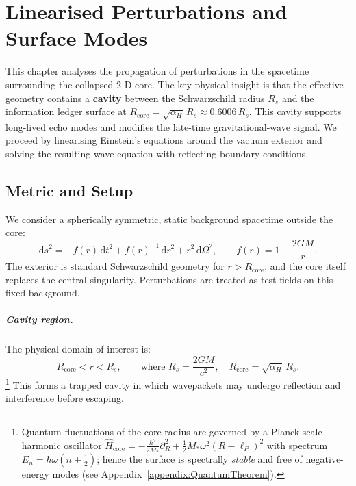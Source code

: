 \documentclass[a4paper, 12pt, oneside]{book}
\numberwithin{equation}{chapter}
\begin{document}

\chapter[Linearised Perturbations and Surface Modes]{Linearised Perturbations and Surface Modes}
\label{chap:Perturbations}

\noindent
This chapter analyses the propagation of perturbations in the spacetime surrounding the collapsed 2-D core. The key physical insight is that the effective geometry contains a \textbf{cavity} between the Schwarzschild radius \( R_s \) and the information ledger surface at \( R_{\text{core}} = \sqrt{\alpha_H}\,R_s \approx 0.6006\,R_s \). This cavity supports long-lived echo modes and modifies the late-time gravitational-wave signal. We proceed by linearising Einstein’s equations around the vacuum exterior and solving the resulting wave equation with reflecting boundary conditions.

\section{Metric and Setup}
\label{sec:Metric}

We consider a spherically symmetric, static background spacetime outside the core:
\[
    \mathrm ds^2 = -f(r)\,\mathrm dt^2 + f(r)^{-1}\,\mathrm dr^2 + r^2\,\mathrm d\Omega^2,
    \qquad
    f(r) = 1 - \frac{2GM}{r}.
\]
The exterior is standard Schwarzschild geometry for \( r > R_{\text{core}} \), and the core itself replaces the central singularity. Perturbations are treated as test fields on this fixed background.

\paragraph{Cavity region.}
The physical domain of interest is:
\[
    R_{\text{core}} < r < R_s,
    \qquad
    \text{where } R_s = \frac{2GM}{c^2},
    \quad
    R_{\text{core}} = \sqrt{\alpha_H}\,R_s. 
\]
\footnote{Quantum fluctuations of the core radius are governed by a Planck-scale harmonic oscillator \(\hat H_{\text{core}} = -\frac{\hbar^{2}}{2M_*}\partial_R^2 + \tfrac12 M_*\omega^2(R-\ell_P)^2\) with spectrum \(E_n=\hbar\omega(n+\tfrac12)\); hence the surface is spectrally \emph{stable} and free of negative-energy modes (see Appendix~\ref{appendix:QuantumTheorem}).}
This forms a trapped cavity in which wavepackets may undergo reflection and interference before escaping.
\end{document}

